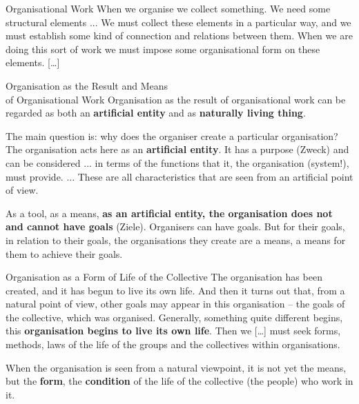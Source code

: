 \documentclass{beamer}
\begin{document}
\begin{frame}{Organisational Work}
When we organise we collect something. We need some structural elements ...
We must collect these elements in a particular way, and we must establish some
kind of connection and relations between them. When we are doing this sort of
work we must impose some organisational form on these elements. [\ldots]

\end{frame}

\begin{frame}{Organisation as the Result and Means\\ of Organisational Work}
Organisation as the result of organisational work can be regarded as both an
\textbf{artificial entity} and as \textbf{naturally living thing}.

The main question is: why does the organiser create a particular organisation?
The organisation acts here as an \textbf{artificial entity}. It has a purpose
(Zweck) and can be considered ... in terms of the functions that it, the
organisation (system!), must provide. ... These are all characteristics that
are seen from an artificial point of view.

As a tool, as a means, \textbf{as an artificial entity, the organisation does
  not and cannot have goals} (Ziele). Organisers can have goals. But for their
goals, in relation to their goals, the organisations they create are a means,
a means for them to achieve their goals.

\end{frame}

\begin{frame}{Organisation as a Form of Life of the Collective}
The organisation has been created, and it has begun to live its own life. And
then it turns out that, from a natural point of view, other goals may appear
in this organisation – the goals of the collective, which was
organised. Generally, something quite different begins, this
\textbf{organisation begins to live its own life}. Then we [\ldots] must seek
forms, methods, laws of the life of the groups and the collectives within
organisations.

When the organisation is seen from a natural viewpoint, it is not yet the
means, but the \textbf{form}, the \textbf{condition} of the life of the
collective (the people) who work in it.

\end{frame}
\end{document}
